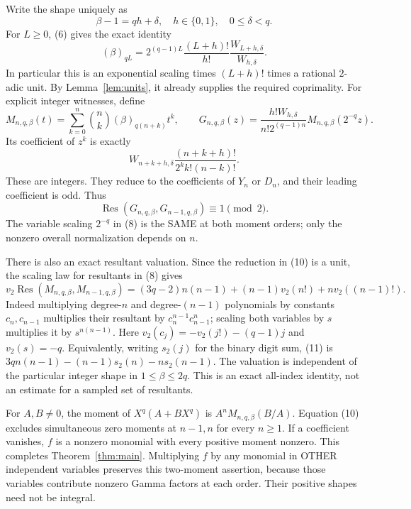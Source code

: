 \documentclass[11pt]{article}
\begin{document}
Write the shape uniquely as
\[
              \beta-1=qh+\delta,\quad h\in\{0,1\},
                                   \quad0\le\delta<q.
\]
For $L\ge0$, (6) gives the exact identity
\[
 (\beta)_{qL}=2^{(q-1)L}\frac{(L+h)!}{h!}
                         \frac{W_{L+h,\delta}}{W_{h,\delta}}. \tag{7}
\]
In particular this is an exponential scaling times $(L+h)!$ times a
rational $2$-adic unit. By Lemma~\ref{lem:units}, it already supplies
the required coprimality. For explicit integer witnesses, define
\[
 M_{n,q,\beta}(t)=\sum_{k=0}^n\binom nk(\beta)_{q(n+k)}t^k,
\qquad
 G_{n,q,\beta}(z)=\frac{h!W_{h,\delta}}{n!2^{(q-1)n}}
                            M_{n,q,\beta}(2^{-q}z).         \tag{8}
\]
Its coefficient of $z^k$ is exactly
\[
               W_{n+k+h,\delta}
                       \frac{(n+k+h)!}{2^k k!(n-k)!}.       \tag{9}
\]
These are integers. They reduce to the coefficients of $Y_n$ or $D_n$,
and their leading coefficient is odd. Thus
\[
             \operatorname{Res}(G_{n,q,\beta},G_{n-1,q,\beta})
                                      \equiv1\pmod2.       \tag{10}
\]
The variable scaling $2^{-q}$ in (8) is the SAME at both moment orders;
only the nonzero overall normalization depends on $n$.

There is also an exact resultant valuation. Since the reduction in (10)
is a unit, the scaling law for resultants in (8) gives
\[
 \boxed{v_2\operatorname{Res}(M_{n,q,\beta},M_{n-1,q,\beta})
 =(3q-2)n(n-1)+(n-1)v_2(n!)+nv_2((n-1)!).}                \tag{11}
\]
Indeed multiplying degree-$n$ and degree-$(n-1)$ polynomials by constants
$c_n,c_{n-1}$ multiplies their resultant by $c_n^{n-1}c_{n-1}^n$;
scaling both variables by $s$ multiplies it by $s^{n(n-1)}$.
Here $v_2(c_j)=-v_2(j!)-(q-1)j$ and $v_2(s)=-q$.
Equivalently, writing $s_2(j)$ for the binary digit sum, (11) is
$3qn(n-1)-(n-1)s_2(n)-ns_2(n-1)$.
The valuation is independent of the particular integer shape in
$1\le\beta\le2q$. This is an exact all-index identity, not an estimate
for a sampled set of resultants.

For $A,B\ne0$, the moment of $X^q(A+BX^q)$ is
$A^n M_{n,q,\beta}(B/A)$. Equation (10) excludes simultaneous zero
moments at $n-1,n$ for every $n\ge1$. If a coefficient vanishes,
$f$ is a nonzero monomial with every positive moment nonzero.
This completes Theorem~\ref{thm:main}.
Multiplying $f$ by any monomial in OTHER independent variables preserves
this two-moment assertion, because those variables contribute nonzero
Gamma factors at each order. Their positive shapes need not be integral.
\end{document}
